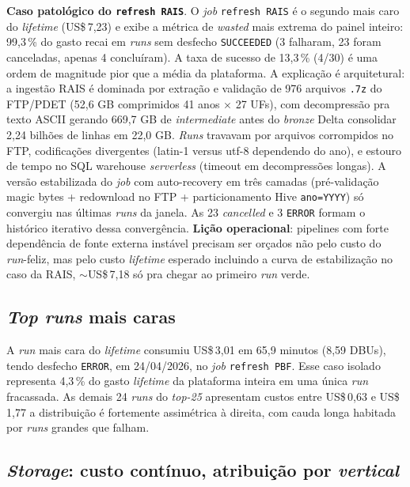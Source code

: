 \documentclass[12pt,a4paper,oneside]{article}
\newcommand{\us}{US\$\,}
\begin{document}
\textbf{Caso patológico do \texttt{refresh RAIS}}. O \textit{job}
\texttt{refresh RAIS} é o segundo mais caro do \textit{lifetime}
(\us 7{,}23) e exibe a métrica de \textit{wasted} mais extrema do
painel inteiro: 99,3\,\% do gasto recai em \textit{runs} sem
desfecho \texttt{SUCCEEDED} (3 falharam, 23 foram canceladas, apenas
4 concluíram). A taxa de sucesso de 13,3\,\% (4/30) é uma ordem de
magnitude pior que a média da plataforma. A explicação é
arquitetural: a ingestão RAIS é dominada por extração e validação
de 976 arquivos \texttt{.7z} do FTP/PDET (52,6 GB comprimidos
\textemdash{} 41 anos $\times$ 27 UFs), com decompressão pra texto
ASCII gerando 669,7 GB de \textit{intermediate} antes do \textit{bronze}
Delta consolidar 2,24 bilhões de linhas em 22,0 GB. \textit{Runs}
travavam por arquivos corrompidos no FTP, codificações divergentes
(latin-1 versus utf-8 dependendo do ano), e estouro de tempo no
SQL warehouse \textit{serverless} (timeout em decompressões longas).
A versão estabilizada do \textit{job} \textemdash{} com auto-recovery
em três camadas (pré-validação magic bytes + redownload no FTP +
particionamento Hive \texttt{ano=YYYY}) \textemdash{} só convergiu
nas últimas \textit{runs} da janela. As 23 \textit{cancelled} e 3
\texttt{ERROR} formam o histórico iterativo dessa convergência.
\textbf{Lição operacional}: pipelines com forte dependência de fonte
externa instável precisam ser orçados não pelo custo do
\textit{run}-feliz, mas pelo custo \textit{lifetime} esperado
incluindo a curva de estabilização \textemdash{} no caso da RAIS,
\(\sim\)\us 7{,}18 só pra chegar ao primeiro \textit{run} verde.

\subsection{\textit{Top runs} mais caras}

A \textit{run} mais cara do \textit{lifetime} consumiu \us 3{,}01
em 65,9 minutos (8,59 DBUs), tendo desfecho \texttt{ERROR}, em
24/04/2026, no \textit{job} \texttt{refresh PBF}. Esse caso
isolado representa 4,3\,\% do gasto \textit{lifetime} da plataforma
inteira em uma única \textit{run} fracassada. As demais 24 \textit{runs}
do \textit{top-25} apresentam custos entre \us 0{,}63 e \us 1{,}77
\textemdash{} a distribuição é fortemente assimétrica à direita,
com cauda longa habitada por \textit{runs} grandes que falham.

\subsection{\textit{Storage}: custo contínuo, atribuição por \textit{vertical}}
\end{document}
